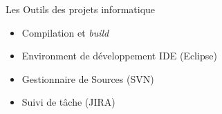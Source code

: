 \begin{frame}{Les Outils des projets informatique}
  \begin{itemize}
    \item Compilation et \textit{build}
    \item Environment de développement IDE (Eclipse)
    \item Gestionnaire de Sources (SVN)
    \item Suivi de tâche (JIRA)
  \end{itemize}
\end{frame}
